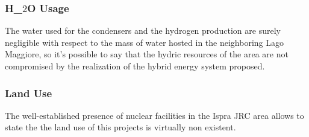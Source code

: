 \subsubsection{H_$2$O Usage}
The water used for the condensers and the hydrogen production are surely negligible with respect to the mass of water hosted in the neighboring Lago Maggiore, so it's possible to say that the hydric resources of the area are not compromised by the realization of the hybrid energy system proposed.

\subsubsection{Land Use}
The well-established presence of nuclear facilities in the Ispra JRC area allows to state the the land use of this projects is virtually non existent.

